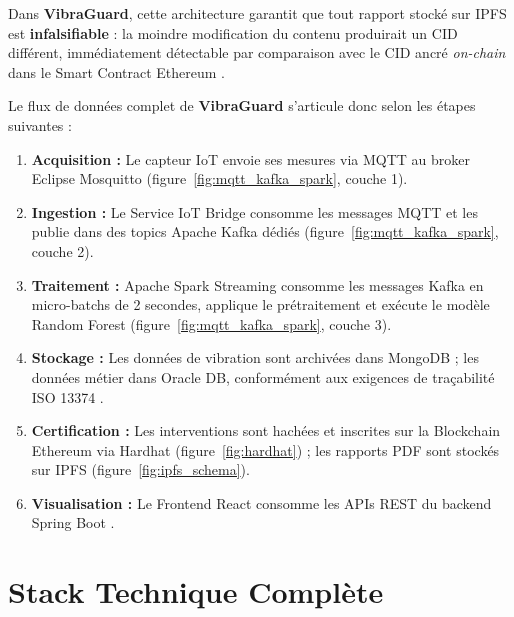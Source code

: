 \documentclass[12pt, a4paper, oneside]{report}
\newcommand{\projectname}{\textbf{VibraGuard}}
\begin{document}
Dans \projectname{}, cette architecture garantit que tout rapport stocké
sur IPFS est \textbf{infalsifiable} : la moindre modification du contenu produirait un
CID différent, immédiatement détectable par comparaison avec le CID ancré \textit{on-chain}
dans le Smart Contract Ethereum \cite{buterin2014}.

\vspace{0.5em}
\noindent Le flux de données complet de \projectname{} s'articule donc selon les étapes suivantes :

\begin{enumerate}
  \item \textbf{Acquisition :} Le capteur IoT envoie ses mesures via MQTT \cite{mqtt}
  au broker Eclipse Mosquitto (figure~\ref{fig:mqtt_kafka_spark}, couche 1).
  \item \textbf{Ingestion :} Le Service IoT Bridge consomme les messages MQTT et les
  publie dans des topics Apache Kafka \cite{kafka} dédiés (figure~\ref{fig:mqtt_kafka_spark},
  couche 2).
  \item \textbf{Traitement :} Apache Spark Streaming \cite{spark} consomme les messages
  Kafka en micro-batchs de 2 secondes, applique le prétraitement et exécute le modèle
  Random Forest \cite{breiman2001,sklearn} (figure~\ref{fig:mqtt_kafka_spark}, couche 3).
  \item \textbf{Stockage :} Les données de vibration sont archivées dans MongoDB ; les
  données métier dans Oracle DB, conformément aux exigences de traçabilité ISO 13374
  \cite{iso13374}.
  \item \textbf{Certification :} Les interventions sont hachées et inscrites sur
  la Blockchain Ethereum \cite{ethereum,buterin2014} via Hardhat
  (figure~\ref{fig:hardhat}) ; les rapports PDF sont stockés sur IPFS \cite{ipfs}
  (figure~\ref{fig:ipfs_schema}).
  \item \textbf{Visualisation :} Le Frontend React \cite{react} consomme les APIs REST
  du backend Spring Boot \cite{springboot}.
\end{enumerate}


\section{Stack Technique Complète}
\end{document}

